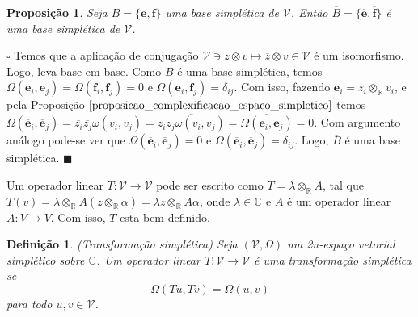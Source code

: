 \documentclass[12pt]{book}
\newtheorem{definicao}[teorema]{Definição}
\newtheorem{proposicao}[teorema]{Proposição}
\newenvironment{prova}[1]{$\square$ #1}{\hfill$\blacksquare$}
\newcommand{\complexificado}[1]{\mathcal{#1}}
\newcommand{\complexificacaoelemento}[2]{#1\otimes_{\reta} #2}
\newcommand{\complexo}[1]{\mathbb{C}^{#1}}
\newcommand{\formaSimpletica}[2]{\omega(#1, #2)}
\newcommand{\formaSimpleticaExtendida}[2]{\Omega(#1, #2)}
\newcommand{\real}[1]{\mathbb{R}^{#1}}
\newcommand{\reta}{\real{}}
\begin{document}
	\begin{proposicao}\label{proposicao_base_simpletica_conjugada}
		Seja $B=\{\textbf{e}, \textbf{f} \}$ uma base simplética de $\complexificado{V}$. Então $\overline{B}=\{\overline{\textbf{e}}, \overline{\textbf{f}}\}$ é uma base simplética de $\complexificado{V}$.
	\end{proposicao}
	\begin{prova}
		Temos que a aplicação de conjugação $\complexificado{V} \ni z\otimes v \mapsto \overline{z}\otimes v \in \complexificado{V}$ é um isomorfismo. Logo, leva base em base. Como $B$ é uma base simplética, temos $\Omega(\textbf{e}_{i}, \textbf{e}_{j}) = \Omega(\textbf{f}_{i}, \textbf{f}_{j}) =0$ e $\Omega(\textbf{e}_{i}, \textbf{f}_{j}) = \delta_{ij}$. Com isso, fazendo $\textbf{e}_{i} = \complexificacaoelemento{z_{i}}{v_{i}}$, e pela Proposição $\ref{proposicao_complexificacao_espaco_simpletico}$ temos $\Omega(\overline{\textbf{e}}_{i}, \overline{\textbf{e}}_{j}) =	\overline{z_{i}}\overline{z_{j}}\formaSimpletica{v_{i}}{v_{j}}=\overline{z_{i}z_{j}\formaSimpletica{v_{i}}{v_{j}}} = \overline{\Omega(\textbf{e}_{i}, \textbf{e}_{j})} = 0$. Com argumento análogo pode-se ver que $\Omega(\overline{\textbf{e}}_{i}, \overline{\textbf{e}}_{j}) =0$ e $\Omega(\overline{\textbf{e}}_{i}, \overline{\textbf{e}}_{j}) =\delta_{ij}$. Logo, $\overline{B}$ é uma base simplética.
	\end{prova}
	
	Um operador linear $T : \complexificado{V} \to \complexificado{V}$ pode ser escrito como $T=\complexificacaoelemento{\lambda}{A}$, tal que $T(v) = \complexificacaoelemento{\lambda}{A}(\complexificacaoelemento{z}{\alpha}) = \complexificacaoelemento{\lambda z}{A\alpha}$, onde $\lambda \in \complexo{}$ e $A$ é um operador linear $A:V \to V$. Com isso, $T$ esta bem definido.
	
	\begin{definicao}
		(Transformação simplética) Seja $(\complexificado{V}, \Omega)$ um 2n-espaço vetorial simplético sobre $\complexo{}$. Um operador linear $T: \complexificado{V} \to \complexificado{V}$ é uma transformação simplética se 
		$$
		\formaSimpleticaExtendida{Tu}{Tv} = \formaSimpleticaExtendida{u}{v}
		$$ para todo $u,v\in \complexificado{V}$.
	\end{definicao}
	
\end{document}
